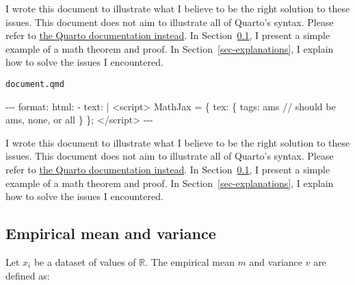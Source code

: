 \documentclass[
  letterpaper,
  DIV=11,
  numbers=noendperiod]{scrartcl}
\newenvironment{Shaded}{\begin{snugshade}}{\end{snugshade}}
\newcommand{\AttributeTok}[1]{\textcolor[rgb]{0.40,0.45,0.13}{#1}}
\newcommand{\CharTok}[1]{\textcolor[rgb]{0.13,0.47,0.30}{#1}}
\newcommand{\FunctionTok}[1]{\textcolor[rgb]{0.28,0.35,0.67}{#1}}
\newcommand{\KeywordTok}[1]{\textcolor[rgb]{0.00,0.23,0.31}{#1}}
\newcommand{\NormalTok}[1]{\textcolor[rgb]{0.00,0.23,0.31}{#1}}
\newcommand{\PreprocessorTok}[1]{\textcolor[rgb]{0.68,0.00,0.00}{#1}}
\theoremstyle{plain}
\theoremstyle{remark}
\begin{document}
I wrote this document to illustrate what I believe to be the right
solution to these issues. This document does not aim to illustrate all
of Quarto's syntax. Please refer to
\href{https://quarto.org/docs/guide/}{the Quarto documentation instead}.
In Section~\ref{sec-empirical-statistics}, I present a simple example of
a math theorem and proof. In Section~\ref{sec-explanations}, I explain
how to solve the issues I encountered.

\begin{codelisting}

\caption{\texttt{document.qmd}}

\begin{Shaded}
\begin{Highlighting}[]
\PreprocessorTok{{-}{-}{-}}
\FunctionTok{format}\KeywordTok{:}
\AttributeTok{  }\FunctionTok{html}\KeywordTok{:}
\KeywordTok{        {-} }\FunctionTok{text}\KeywordTok{:}\AttributeTok{ }\CharTok{|}
\NormalTok{            \textless{}script\textgreater{}}
\NormalTok{            MathJax = \{}
\NormalTok{                tex: \{}
\NormalTok{                    tags: \textquotesingle{}ams\textquotesingle{}  // should be \textquotesingle{}ams\textquotesingle{}, \textquotesingle{}none\textquotesingle{}, or \textquotesingle{}all\textquotesingle{}}
\NormalTok{                \}}
\NormalTok{            \};}
\NormalTok{            \textless{}/script\textgreater{}}
\PreprocessorTok{{-}{-}{-}}
\end{Highlighting}
\end{Shaded}

\end{codelisting}

I wrote this document to illustrate what I believe to be the right
solution to these issues. This document does not aim to illustrate all
of Quarto's syntax. Please refer to
\href{https://quarto.org/docs/guide/}{the Quarto documentation instead}.
In Section~\ref{sec-empirical-statistics}, I present a simple example of
a math theorem and proof. In Section~\ref{sec-explanations}, I explain
how to solve the issues I encountered.

\hypertarget{sec-empirical-statistics}{%
\subsection{Empirical mean and
variance}\label{sec-empirical-statistics}}

Let \(x_i\) be a dataset of values of \(\mathbb{R}\). The empirical mean
\(m\) and variance \(v\) are defined as:
\end{document}
